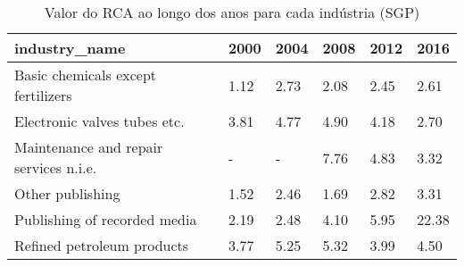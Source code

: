 \begin{table}
\centering
\caption{Valor do RCA ao longo dos anos para cada indústria (SGP)}
\begin{tabular}{p{6cm}p{1.5cm}p{1.5cm}p{1.5cm}p{1.5cm}p{1.5cm}}
\toprule
                         industry\_name & 2000 & 2004 & 2008 & 2012 &  2016 \\
\midrule
    Basic chemicals except fertilizers & 1.12 & 2.73 & 2.08 & 2.45 &  2.61 \\
          Electronic valves tubes etc. & 3.81 & 4.77 & 4.90 & 4.18 &  2.70 \\
Maintenance and repair services n.i.e. &    - &    - & 7.76 & 4.83 &  3.32 \\
                      Other publishing & 1.52 & 2.46 & 1.69 & 2.82 &  3.31 \\
          Publishing of recorded media & 2.19 & 2.48 & 4.10 & 5.95 & 22.38 \\
            Refined petroleum products & 3.77 & 5.25 & 5.32 & 3.99 &  4.50 \\
\bottomrule
\end{tabular}
\end{table}
